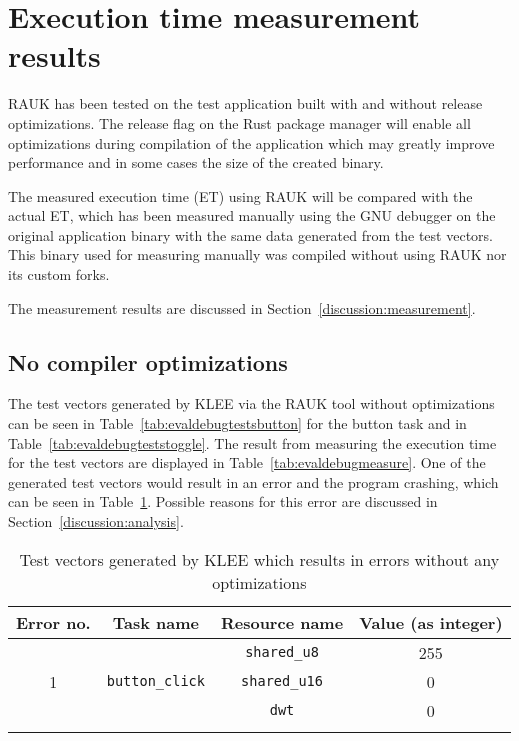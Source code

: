 

\section{Execution time measurement results}
RAUK has been tested on the test application built with and without release
optimizations. The release flag on the Rust package manager will enable all
optimizations during compilation of the application which may greatly improve
performance and in some cases the size of the created binary.

The measured execution time (ET) using RAUK will be compared with the actual
ET\@, which has been measured manually using the GNU debugger on the original
application binary with the same data generated from the test vectors. This
binary used for measuring manually was compiled without using RAUK nor its
custom forks.

The measurement results are discussed in Section~\ref{discussion:measurement}.

\subsection{No compiler optimizations}
The test vectors generated by KLEE via the RAUK tool without optimizations can
be seen in Table~\ref{tab:evaldebugtestsbutton} for the button task and in
Table~\ref{tab:evaldebugteststoggle}. The result from measuring the execution
time for the test vectors are displayed in Table~\ref{tab:evaldebugmeasure}.
One of the generated test vectors would result in an error and the program
crashing, which can be seen in Table~\ref{tab:evaldebugtestsbuttonerror}. Possible
reasons for this error are discussed in Section~\ref{discussion:analysis}.

\begin{longtable}{|c|c|c|c|}
\hline
Error no. & Task name & Resource name & Value (as integer) \\ \hline
\multirow{3}{*}{1} & \multirow{3}{*}{\texttt{button\_click}} & \texttt{shared\_u8}  & 255 \\ \cline{3-4}
                   &                                         & \texttt{shared\_u16} & 0 \\ \cline{3-4}
                   &                                         & \texttt{dwt}         & 0 \\ \hline
\caption{Test vectors generated by KLEE which results in errors without any optimizations}
\label{tab:evaldebugtestsbuttonerror}
\end{longtable}

